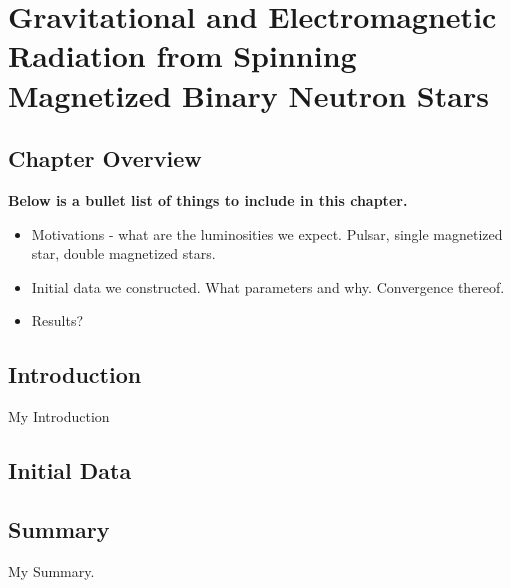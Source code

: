 \chapter{Gravitational and Electromagnetic Radiation from Spinning Magnetized Binary Neutron Stars}

\section{Chapter Overview}

{\bf Below is a bullet list of things to include in this chapter.}
\begin{itemize}
\item Motivations - what are the luminosities we expect. Pulsar, single magnetized star, double magnetized stars.
\item Initial data we constructed. What parameters and why. Convergence thereof.
\item Results?
\end{itemize}

\section{Introduction}

My Introduction

\section{Initial Data}



\section{Summary }

My Summary.
